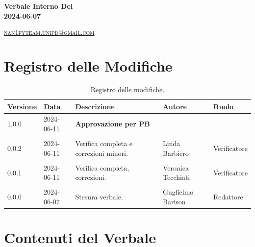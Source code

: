 \documentclass[8pt]{article}
\begin{document}
\begin{titlepage}
\begin{minipage}[t]{0.47\textwidth}
{		}
		\vspace{4mm}\vspace{4mm}
	\end{minipage}
	\vspace{4cm}
	\begin{center}
		\begin{flushright}
			{\fontsize{30pt}{52pt}\selectfont \textbf{Verbale Interno Del\\2024-06-07\\}} %
		\end{flushright}
		\vspace{3cm}
	\end{center}
	\vspace{8.5 cm}
	{\small \textsc{\href{mailto: nan1fyteam.unipd@gmail.com}{nan1fyteam.unipd@gmail.com}}}
\end{titlepage}
\pagestyle{mystyle}
\section*{Registro delle Modifiche}
\begin{table}[ht!]	
	\centering
	\begin{tabular}{p{1.2cm} p{2cm} p{6cm} p{3cm} p{2cm}}
		\toprule
		\textbf{Versione}& \textbf{Data} & \textbf{Descrizione} & \textbf{Autore} & \textbf{Ruolo} \\
		\midrule
			1.0.0 & 2024-06-11 & \textbf{Approvazione per PB} & & \\\\
			0.0.2 & 2024-06-11 & Verifica completa e correzioni minori. & Linda Barbiero & Verificatore \\\\
            0.0.1 & 2024-06-11 & Verifica completa, correzioni. & Veronica Tecchiati & Verificatore \\\\
			0.0.0 & 2024-06-07 & Stesura verbale. & Guglielmo Barison & Redattore
 			\\ %

		\bottomrule
	\end{tabular}
	\caption{Registro delle modifiche.}
	\label{table:Registro delle modifiche}
\end{table}
\newpage
\tableofcontents
\clearpage
\newpage
\justifying
\section{Contenuti del Verbale}
\end{document}
